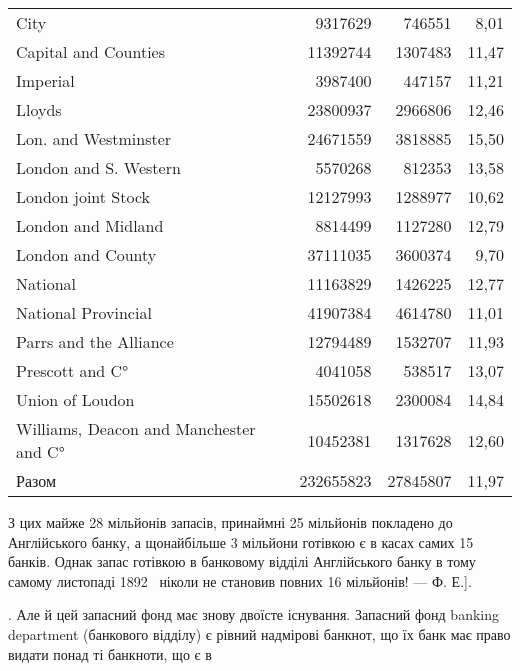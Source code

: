 {\begin{tabularx}{\textwidth}{l r r r}
City \dotfill{}                                    & 9317629  & 746551  & 8,01 \\
Capital and Counties \dotfill{}                   & 11392744 & 1307483 & 11,47 \\
Imperial \dotfill{}                               & 3987400  & 447157  & 11,21 \\
Lloyds \dotfill{}                                 & 23800937 & 2966806 & 12,46 \\
Lon. and Westminster \dotfill{}                   & 24671559 & 3818885 & 15,50 \\
London and S. Western \dotfill{}                  & 5570268  & 812353  & 13,58 \\
London joint Stock \dotfill{}                     & 12127993 & 1288977 & 10,62 \\
London and Midland \dotfill{}                     & 8814499  & 1127280 & 12,79 \\
London and County \dotfill{}                      & 37111035 & 3600374 & 9,70 \\
National \dotfill{}                               & 11163829 & 1426225 & 12,77 \\
National Provincial \dotfill{}                     & 41907384 & 4614780 & 11,01 \\
Parrs and the Alliance \dotfill{}                 & 12794489 & 1532707 & 11,93 \\
Prescott and C° \dotfill{}                        & 4041058  & 538517  & 13,07 \\
Union of Loudon \dotfill{}                       & 15502618 & 2300084 & 14,84 \\
Williams, Deacon and Manchester and C°\dotfill{} & 10452381 & 1317628 & 12,60 \\
\cmidrule(lr){1-4}
Разом                                  & 232655823 & 27845807 & 11,97

  \end{tabularx}

З цих майже 28 мільйонів запасів, принаймні 25 мільйонів покладено до Англійського банку, а
щонайбільше 3 мільйони готівкою є в касах самих 15 банків. Однак запас готівкою в банковому відділі
Англійського банку в тому самому листопаді 1892~ ніколи не становив повних 16 мільйонів! — Ф. Е.].

}. Але й цей запасний фонд має знову двоїсте
існування. Запасний фонд banking department (банкового відділу) є рівний
надмірові банкнот, що їх банк має право видати понад ті банкноти, що є в

